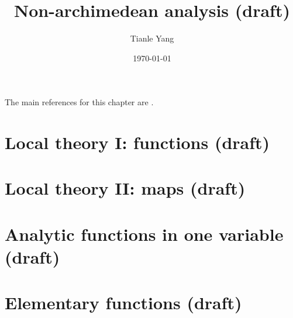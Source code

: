 \documentclass[sectionlevel=chapter]{noteformyself}
\title{Non-archimedean analysis (draft)}
\author{Tianle Yang}
\date{\today}
\begin{document}
    \maketitle

    \tableofcontents

    \vspace{1cm}

    The main references for this chapter are \cite{Gou97padic,Rob00padic,Li18aljabr1}.

    \section{Local theory I: functions (draft)}
    
    \section{Local theory II: maps (draft)}
    
    \section{Analytic functions in one variable (draft)}
    
    \section{Elementary functions (draft)}
    


    \printbibliography[heading=bibintoc, title={References}]
    
\end{document}
